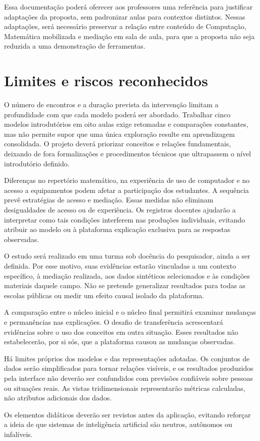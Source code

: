 Essa documentação poderá oferecer aos professores uma referência para justificar adaptações da proposta, sem padronizar aulas para contextos distintos. Nessas adaptações, será necessário preservar a relação entre conteúdo de Computação, Matemática mobilizada e mediação em sala de aula, para que a proposta não seja reduzida a uma demonstração de ferramentas.

\section{Limites e riscos reconhecidos}

O número de encontros e a duração prevista da intervenção limitam a profundidade com que cada modelo poderá ser abordado. Trabalhar cinco modelos introdutórios em oito aulas exige retomadas e comparações constantes, mas não permite supor que uma única exploração resulte em aprendizagem consolidada. O projeto deverá priorizar conceitos e relações fundamentais, deixando de fora formalizações e procedimentos técnicos que ultrapassem o nível introdutório definido.

Diferenças no repertório matemático, na experiência de uso de computador e no acesso a equipamentos podem afetar a participação dos estudantes. A sequência prevê estratégias de acesso e mediação. Essas medidas não eliminam desigualdades de acesso ou de experiência. Os registros docentes ajudarão a interpretar como tais condições interferem nas produções individuais, evitando atribuir ao modelo ou à plataforma explicação exclusiva para as respostas observadas.

O estudo será realizado em uma turma sob docência do pesquisador, ainda a ser definida. Por esse motivo, suas evidências estarão vinculadas a um contexto específico, à mediação realizada, aos dados sintéticos selecionados e às condições materiais daquele campo. Não se pretende generalizar resultados para todas as escolas públicas ou medir um efeito causal isolado da plataforma.

A comparação entre o núcleo inicial e o núcleo final permitirá examinar mudanças e permanências nas explicações. O desafio de transferência acrescentará evidências sobre o uso dos conceitos em outra situação. Esses resultados não estabelecerão, por si sós, que a plataforma causou as mudanças observadas.

Há limites próprios dos modelos e das representações adotadas. Os conjuntos de dados serão simplificados para tornar relações visíveis, e os resultados produzidos pela interface não deverão ser confundidos com previsões confiáveis sobre pessoas ou situações reais. As vistas tridimensionais representarão métricas calculadas, não atributos adicionais dos dados.

Os elementos didáticos deverão ser revistos antes da aplicação, evitando reforçar a ideia de que sistemas de inteligência artificial são neutros, autônomos ou infalíveis.
